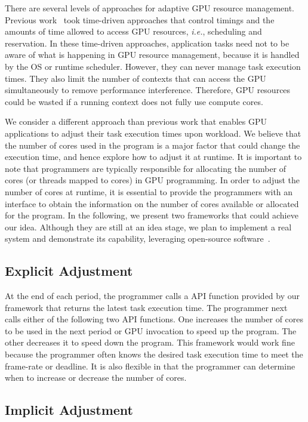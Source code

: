 \documentclass[times, 10pt, twocolumn]{article}
\begin{document}
There are several levels of approaches for adaptive GPU resource
management.
Previous work~\cite{Kato_RTAS11, Kato_RTSS11, Kato_ATC11} took
time-driven approaches that control timings and the amounts of time
allowed to access GPU resources, \textit{i.e.}, scheduling and
reservation.
In these time-driven approaches, application tasks need not to be aware
of what is happening in GPU resource management, because it is handled
by the OS or runtime scheduler.
However, they can never manage task execution times.
They also limit the number of contexts that can access the GPU
simultaneously to remove performance interference.
Therefore, GPU resources could be wasted if a running context does not
fully use compute cores.

We consider a different approach than previous work that enables GPU
applications to adjust their task execution times upon workload.
We believe that the number of cores used in the program is a major
factor that could change the execution time, and hence explore how to
adjust it at runtime.
It is important to note that programmers are typically responsible for
allocating the number of cores (or threads mapped to cores) in GPU
programming.
In order to adjust the number of cores at runtime, it is essential to
provide the programmers with an interface to obtain the information on
the number of cores available or allocated for the program.
In the following, we present two frameworks that could achieve our idea.
Although they are still at an idea stage, we plan to implement a real
system and demonstrate its capability, leveraging open-source
software~\cite{Kato_OSPERT11}.

\subsection{Explicit Adjustment}

At the end of each period, the programmer calls a API function provided
by our framework that returns the latest task execution time.
The programmer next calls either of the following two API functions.
One increases the number of cores to be used in the next period or GPU
invocation to speed up the program.
The other decreases it to speed down the program.
This framework would work fine because the programmer often knows the
desired task execution time to meet the frame-rate or deadline.
It is also flexible in that the programmer can determine when to
increase or decrease the number of cores.

\subsection{Implicit Adjustment}
\end{document}
